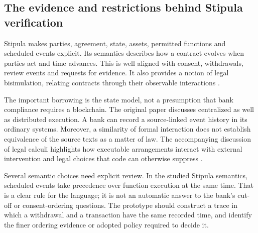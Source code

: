 \subsection{The evidence and restrictions behind Stipula verification}
\label{merge:P-02-literature:05}


Stipula makes parties, agreement, state, assets, permitted functions and scheduled
events explicit. Its semantics describes how a contract evolves when parties act
and time advances. This is well aligned with consent, withdrawals, review events
and requests for evidence. It also provides a notion of legal bisimulation,
relating contracts through their observable interactions
\citep[secs.~3--5]{stipula2021}.

The important borrowing is the state model, not a presumption that bank compliance
requires a blockchain. The original paper discusses centralized as well as
distributed execution. A bank can record a source-linked event history in its
ordinary systems. Moreover, a similarity of formal interaction does not establish
equivalence of the source texts as a matter of law. The accompanying discussion
of legal calculi highlights how executable arrangements interact with external
intervention and legal choices that code can otherwise suppress
\citep{stipula2021,crafa2022}.

Several semantic choices need explicit review. In the studied Stipula semantics,
scheduled events take precedence over function execution at the same time. That
is a clear rule for the language; it is not an automatic answer to the bank's
cut-off or consent-ordering questions. The prototype should construct a trace in
which a withdrawal and a transaction have the same recorded time, and identify
the finer ordering evidence or adopted policy required to decide it.


